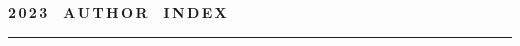 \def\stat{cont-e}
{%
\raggedleft\Large \bf%
2\,0\,2\,3\ \ A\,U\,T\,H\,O\,R\ \ I\,N\,D\,E\,X \vskip 17pt
 \hrule
 \par
{} }

\label{st\stat}

\def\tit{\ }

\def\aut{\ }
\def\auf{\ }

\def\leftkol{\ } %

\def\rightkol{\ } %

\titele{\tit}{\aut}{\auf}{\leftkol}{\rightkol}

\def\leftfootline{\small{\textbf{\thepage}
\hfill INFORMATIKA I EE PRIMENENIYA~--- INFORMATICS AND APPLICATIONS\ \ \ 2023\
\ \ volume~17\ \ \ issue\ 4}
}%
 \def\rightfootline{\small{INFORMATIKA I EE PRIMENENIYA~--- INFORMATICS AND APPLICATIONS\ \ \ 2023\ \ \ volume~17\ \ \ issue\ 4
\hfill \textbf{\thepage}}}

\vspace*{-24pt}

